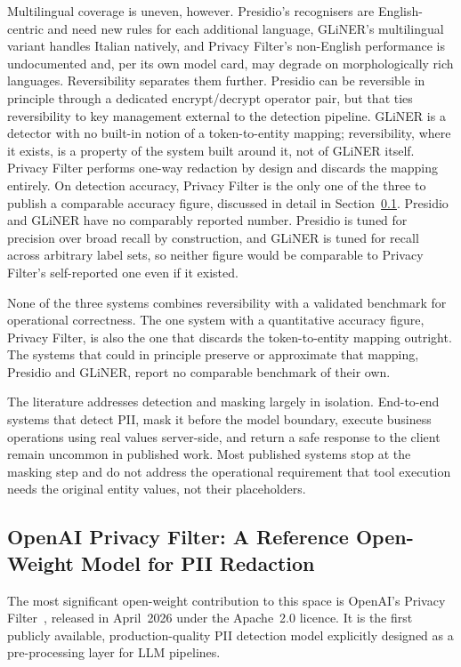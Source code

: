 Multilingual coverage is uneven, however. Presidio's recognisers are English-centric and need new rules for each additional language, GLiNER's multilingual variant handles Italian natively, and Privacy Filter's non-English performance is undocumented and, per its own model card, may degrade on morphologically rich languages. Reversibility separates them further. Presidio can be reversible in principle through a dedicated encrypt/decrypt operator pair, but that ties reversibility to key management external to the detection pipeline. GLiNER is a detector with no built-in notion of a token-to-entity mapping; reversibility, where it exists, is a property of the system built around it, not of GLiNER itself. Privacy Filter performs one-way redaction by design and discards the mapping entirely. On detection accuracy, Privacy Filter is the only one of the three to publish a comparable accuracy figure, discussed in detail in Section~\ref{subsec:background_openai_privacy_filter}. Presidio and GLiNER have no comparably reported number. Presidio is tuned for precision over broad recall by construction, and GLiNER is tuned for recall across arbitrary label sets, so neither figure would be comparable to Privacy Filter's self-reported one even if it existed.

None of the three systems combines reversibility with a validated benchmark for operational correctness. The one system with a quantitative accuracy figure, Privacy Filter, is also the one that discards the token-to-entity mapping outright. The systems that could in principle preserve or approximate that mapping, Presidio and GLiNER, report no comparable benchmark of their own.

The literature addresses detection and masking largely in isolation. End-to-end systems that detect PII, mask it before the model boundary, execute business operations using real values server-side, and return a safe response to the client remain uncommon in published work. Most published systems stop at the masking step and do not address the operational requirement that tool execution needs the original entity values, not their placeholders.

\subsection{OpenAI Privacy Filter: A Reference Open-Weight Model for PII Redaction}
\label{subsec:background_openai_privacy_filter}

The most significant open-weight contribution to this space is OpenAI's Privacy Filter~\cite{openai2025privacyfilter}, released in April~2026 under the Apache~2.0 licence. It is the first publicly available, production-quality PII detection model explicitly designed as a pre-processing layer for LLM pipelines.

